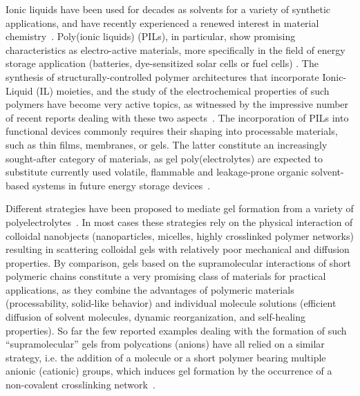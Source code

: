\documentclass[prl,a4paper,twocolumn,superscriptaddress,showkeys]{revtex4}
\begin{document}
\maketitle

Ionic liquids have been used for decades as solvents for a variety of synthetic applications, and have recently experienced a renewed interest in material chemistry~\cite{Antonietti2004,Hapiot2008,Ichikawa2011,MacFarlane2014}. Poly(ionic liquids) (PILs), in particular, show promising characteristics as electro-active materials, more specifically in the field of energy storage application (batteries, dye-sensitized solar cells or fuel cells) \cite{Ohno2001,Kim2011b,Mecerreyes2011,Zhao2011,Yuan2013}. The synthesis of structurally-controlled polymer architectures that incorporate Ionic-Liquid (IL) moieties, and the study of the electrochemical properties of such polymers have become very active topics, as witnessed by the impressive number of recent reports dealing with these two aspects~\cite{Hirao2000,Yuan2011,Matyjaszewski1999,Appukuttan2012}.
The incorporation of PILs into functional devices commonly requires their shaping into processable materials, such as thin films, membranes, or gels. The latter constitute an increasingly sought-after category of materials, as gel poly(electrolytes) are expected to substitute currently used volatile, flammable and leakage-prone organic solvent-based systems in future energy storage devices~\cite{Wang2003,Choudhury2009,Lewandowski2004}.

Different strategies have been proposed to mediate gel formation from a variety of polyelectrolytes~\cite{Katsampas2005,Xiong2012,Hu2014}. In most cases these strategies rely on the physical interaction of colloidal nanobjects (nanoparticles, micelles, highly crosslinked polymer networks) resulting in scattering colloidal gels with relatively poor mechanical and diffusion properties. By comparison, gels based on the supramolecular interactions of short polymeric chains constitute a very promising class of materials for practical applications, as they combine the advantages of polymeric materials (processability, solid-like behavior) and individual molecule solutions (efficient diffusion of solvent molecules, dynamic reorganization, and self-healing properties)\cite{Noro2011,Li2014,Furusho2014}. So far the few reported examples dealing with the formation of such ``supramolecular'' gels from polycations (anions) have all relied on a similar strategy, i.e. the addition of a molecule or a short polymer bearing multiple anionic (cationic) groups, which induces gel formation by the occurrence of a non-covalent crosslinking network~\cite{Zhao2013,Becht2011}.
\end{document}
